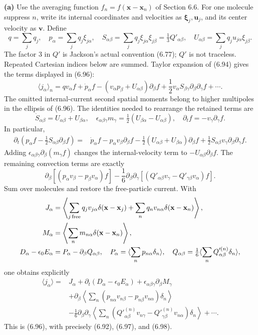 \textbf{(a)} Use the averaging function $f_n=f(\mathbf x-\mathbf x_n)$ of
Section 6.6. For one molecule suppress $n$, write its internal coordinates
and velocities as $\boldsymbol\xi_j,\mathbf u_j$, and its center velocity
as $\mathbf v$. Define
\[
q=\sum_jq_j,\quad p_\alpha=\sum_jq_j\xi_{j\alpha},\quad
S_{\alpha\beta}=\sum_jq_j\xi_{j\alpha}\xi_{j\beta}
=\tfrac13Q'_{\alpha\beta},\quad
U_{\alpha\beta}=\sum_jq_ju_{j\alpha}\xi_{j\beta}.
\]
The factor $3$ in $Q'$ is Jackson's actual convention (6.77); $Q'$ is not
traceless. Repeated Cartesian indices below are summed. Taylor expansion
of (6.94) gives the terms displayed in (6.96):
\[
\langle j_\alpha\rangle_n=qv_\alpha f+\dot p_\alpha f
-(v_\alpha p_\beta+U_{\alpha\beta})\partial_\beta f
+\frac12v_\alpha S_{\beta\gamma}\partial_\beta\partial_\gamma f+\cdots.
\]
The omitted internal-current second spatial moments belong to higher
multipoles in the ellipsis of (6.96). The identities needed to rearrange
the retained terms are
\[
\dot S_{\alpha\beta}=U_{\alpha\beta}+U_{\beta\alpha},\quad
\epsilon_{\alpha\beta\gamma}m_\gamma
=\tfrac12(U_{\beta\alpha}-U_{\alpha\beta}),\quad
\partial_tf=-v_\gamma\partial_\gamma f.
\]
In particular,
\begin{align*}
\partial_t\left(p_\alpha f-\tfrac12S_{\alpha\beta}\partial_\beta f\right)
={}&\dot p_\alpha f-p_\alpha v_\beta\partial_\beta f
-\tfrac12(U_{\alpha\beta}+U_{\beta\alpha})\partial_\beta f
+\tfrac12S_{\alpha\beta}v_\gamma\partial_\beta\partial_\gamma f.
\end{align*}
Adding $\epsilon_{\alpha\beta\gamma}\partial_\beta(m_\gamma f)$
changes the internal-velocity term to $-U_{\alpha\beta}\partial_\beta f$.
The remaining convection terms are exactly
\[
\partial_\beta[(p_\alpha v_\beta-p_\beta v_\alpha)f]
-\frac16\partial_\beta\partial_\gamma
[(Q'_{\alpha\beta}v_\gamma-Q'_{\gamma\beta}v_\alpha)f].
\]
Sum over molecules and restore the free-particle current. With
\begin{align*}
J_\alpha&=\left\langle\sum_{j\,\rm free}q_jv_{j\alpha}
\delta(\mathbf x-\mathbf x_j)+\sum_nq_nv_{n\alpha}\delta(\mathbf x-\mathbf x_n)\right\rangle,\\
M_\alpha&=\left\langle\sum_nm_{n\alpha}\delta(\mathbf x-\mathbf x_n)\right\rangle,\\
D_\alpha-\epsilon_0E_\alpha
&=P_\alpha-\partial_\beta Q_{\alpha\beta},\quad
P_\alpha=\langle\sum_np_{n\alpha}\delta_n\rangle,\quad
Q_{\alpha\beta}=\tfrac16\langle\sum_nQ'^{(n)}_{\alpha\beta}\delta_n\rangle,
\end{align*}
one obtains explicitly
\begin{align*}
\langle j_\alpha\rangle={}&J_\alpha+\partial_t(D_\alpha-\epsilon_0E_\alpha)
+\epsilon_{\alpha\beta\gamma}\partial_\beta M_\gamma\\
&+\partial_\beta\left\langle\sum_n
(p_{n\alpha}v_{n\beta}-p_{n\beta}v_{n\alpha})\delta_n\right\rangle\\
&-\frac16\partial_\beta\partial_\gamma\left\langle\sum_n
(Q'^{(n)}_{\alpha\beta}v_{n\gamma}-Q'^{(n)}_{\gamma\beta}v_{n\alpha})\delta_n\right\rangle
+\cdots .
\end{align*}
This is (6.96), with precisely (6.92), (6.97), and (6.98).

